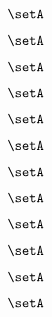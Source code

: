 {\begin{forslides}
        \begin{equation}
            \label{eq:slides-translation-49}
            \setA
        \end{equation}

        \begin{equation}
            \label{eq:slides-translation-50}
            \setA
        \end{equation}

        \begin{equation}
            \label{eq:slides-translation-51}
            \setA
        \end{equation}

        \begin{equation}
            \label{eq:slides-translation-52}
            \setA
        \end{equation}

        \begin{equation}
            \label{eq:slides-translation-53}
            \setA
        \end{equation}

        \begin{equation}
            \label{eq:slides-translation-54}
            \setA
        \end{equation}

        \begin{equation}
            \label{eq:slides-translation-55}
            \setA
        \end{equation}

        \begin{equation}
            \label{eq:slides-translation-56}
            \setA
        \end{equation}

        \begin{equation}
            \label{eq:slides-translation-57}
            \setA
        \end{equation}

        \begin{equation}
            \label{eq:slides-translation-58}
            \setA
        \end{equation}

        \begin{equation}
            \label{eq:slides-translation-59}
            \setA
        \end{equation}

        \begin{equation}
            \label{eq:slides-translation-60}
            \setA
        \end{equation}


\end{forslides}}
